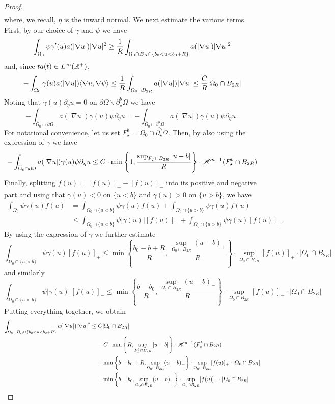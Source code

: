 \documentclass[10 pt,a4paper]{article}
\theoremstyle{definition}
\begin{document}
\begin{proof}
\begin{align*}
	\end{align*}
	where, we recall, $\eta$ is the inward normal. We next  estimate the various terms. First, by our choice of $\gamma$ and $\psi$ we have
	\[
		\int_{\Omega_0} \psi \gamma'(u) a(|\nabla u|) |\nabla u|^2 \geq \frac{1}{R} \int_{\Omega_0 \cap B_R \cap \{b_0 < u < b_0+R\}} a(|\nabla u|) |\nabla u|^2
	\]
	and, since $ta(t) \in L^\infty(\mathbb R^+)$,
	\[
		- \int_{\Omega_0} \gamma(u) a(|\nabla u|) \langle \nabla u, \nabla \psi \rangle \leq \frac{1}{R} \int_{\Omega_0 \cap B_{2R}} a(|\nabla u|) |\nabla u| \leq \frac{C}{R} |\Omega_0 \cap B_{2R}|
	\]
	Noting that $\gamma(u)\partial_\eta u = 0$ on $\partial\Omega \backslash \partial^b_\star\Omega$ we have
	\[
		- \int_{\overline{\Omega}_0\cap\partial \Omega} a(|\nabla u|) \gamma(u) \psi \partial_\eta u = - \int_{\overline{\Omega}_0\cap\partial^b_\star \Omega} a(|\nabla u|) \gamma(u) \psi \partial_\eta u \, .
	\]
	For notational convenience, let us set $F^b_\star = \overline{\Omega}_0\cap\partial^b_\star \Omega$. Then, by also using the expression of $\gamma$ we have
	\[
		- \int_{\overline{\Omega}_0\cap\partial \Omega} a(|\nabla u|) \gamma(u) \psi \partial_\eta u \leq C \cdot \min\left\{1,\dfrac{\sup_{F^b_\star \cap B_{2R}}|u-b|}{R}\right\} \cdot \mathscr{H}^{n-1}(F^b_\star\cap B_{2R})
	\]
	Finally, splitting $f(u) = [f(u)]_+ - [f(u)]_-$ into its positive and negative part and using that $\gamma(u) < 0$ on $\{u<b\}$ and $\gamma(u)>0$ on $\{u>b\}$, we have
	\begin{align*}
		\int_{\Omega_0} \psi \gamma(u)f(u) & = \int_{\Omega_0 \cap \{u<b\}} \psi \gamma(u)f(u) + \int_{\Omega_0 \cap \{u>b\}} \psi \gamma(u)f(u) \\
		& \leq \int_{\Omega_0 \cap \{u<b\}} \psi |\gamma(u)| [f(u)]_- + \int_{\Omega_0 \cap \{u>b\}} \psi \gamma(u) [f(u)]_+ .
	\end{align*}
	By using the expression of $\gamma$ we further estimate
	\[
		\int_{\Omega_0 \cap \{u>b\}} \psi \gamma(u) [f(u)]_+ \leq \min\left\{\frac{b_0-b+R}{R},\frac{\sup_{\Omega_0\cap B_{2R}} (u-b)_+}{R} \right\} \cdot \sup_{\Omega_0\cap B_{2R}} [f(u)]_+ \cdot |\Omega_0 \cap B_{2R}|
	\]
	and similarly
	\[
		\int_{\Omega_0 \cap \{u<b\}} \psi |\gamma(u)| [f(u)]_- \leq \min\left\{\frac{b-b_0}{R},\frac{\sup_{\Omega_0\cap B_{2R}} (u-b)_-}{R} \right\} \cdot \sup_{\Omega_0\cap B_{2R}} [f(u)]_- \cdot |\Omega_0 \cap B_{2R}|
	\]
	Putting everything together, we obtain
	\begin{align*}
		\int_{\Omega_0 \cap B_R \cap \{b_0 < u < b_0+R\}} a(|\nabla u|) |\nabla u|^2 & \leq C |\Omega_0 \cap B_{2R}| \\
		& \phantom{=\;} + C \cdot \min\left\{R,\sup_{F^b_\star\cap B_{2R}}|u-b|\right\} \cdot \mathscr{H}^{n-1}(F^b_\star\cap B_{2R}) \\
		& \phantom{=\;} + \min\left\{b-b_0+R,\sup_{\Omega_0\cap B_{2R}} (u-b)_+ \right\} \cdot \sup_{\Omega_0\cap B_{2R}} [f(u)]_+ \cdot |\Omega_0 \cap B_{2R}| \\
		& \phantom{=\;} + \min\left\{b-b_0,\sup_{\Omega_0\cap B_{2R}} (u-b)_- \right\} \cdot \sup_{\Omega_0\cap B_{2R}} [f(u)]_- \cdot |\Omega_0 \cap B_{2R}|
	\end{align*}
	

\end{proof}
\end{document}
